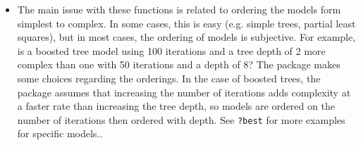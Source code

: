 \documentclass[12pt]{article}
\begin{document}
\begin{itemize}
  \item[] The main issue with these functions is related to ordering the models form simplest to complex. In some cases, this is easy (e.g. simple trees, partial least squares), but in most cases, the ordering of models is subjective. For example, is a boosted tree model using 100 iterations and a tree depth of 2 more complex than one with 50 iterations and a depth of 8? The package makes some choices regarding the orderings. In the case of boosted trees, the package assumes that increasing the number of iterations adds complexity at a faster rate than increasing the tree depth, so models are ordered on the number of iterations then ordered with depth. See \texttt{?best} for more examples for specific models..

\end{itemize}
\end{document}
